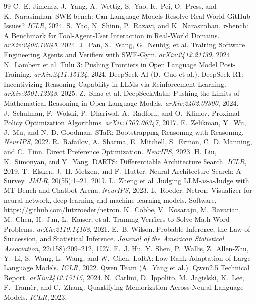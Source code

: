 \documentclass[11pt]{article}
\begin{document}
\begin{thebibliography}{99}
 C.~E. Jimenez, J.~Yang, A.~Wettig, S.~Yao, K.~Pei, O.~Press, and K.~Narasimhan. SWE-bench: Can Language Models Resolve Real-World GitHub Issues? \emph{ICLR}, 2024.
 S.~Yao, N.~Shinn, P.~Razavi, and K.~Narasimhan. $\tau$-bench: A Benchmark for Tool-Agent-User Interaction in Real-World Domains. \emph{arXiv:2406.12045}, 2024.
 J.~Pan, X.~Wang, G.~Neubig, et al. Training Software Engineering Agents and Verifiers with SWE-Gym. \emph{arXiv:2412.21139}, 2024.
 N.~Lambert et al. Tulu 3: Pushing Frontiers in Open Language Model Post-Training. \emph{arXiv:2411.15124}, 2024.
 DeepSeek-AI (D.~Guo et al.). DeepSeek-R1: Incentivizing Reasoning Capability in LLMs via Reinforcement Learning. \emph{arXiv:2501.12948}, 2025.
 Z.~Shao et al. DeepSeekMath: Pushing the Limits of Mathematical Reasoning in Open Language Models. \emph{arXiv:2402.03300}, 2024.
 J.~Schulman, F.~Wolski, P.~Dhariwal, A.~Radford, and O.~Klimov. Proximal Policy Optimization Algorithms. \emph{arXiv:1707.06347}, 2017.
 E.~Zelikman, Y.~Wu, J.~Mu, and N.~D. Goodman. STaR: Bootstrapping Reasoning with Reasoning. \emph{NeurIPS}, 2022.
 R.~Rafailov, A.~Sharma, E.~Mitchell, S.~Ermon, C.~D. Manning, and C.~Finn. Direct Preference Optimization. \emph{NeurIPS}, 2023.
 H.~Liu, K.~Simonyan, and Y.~Yang. DARTS: Differentiable Architecture Search. \emph{ICLR}, 2019.
 T.~Elsken, J.~H. Metzen, and F.~Hutter. Neural Architecture Search: A Survey. \emph{JMLR}, 20(55):1--21, 2019.
 L.~Zheng et al. Judging LLM-as-a-Judge with MT-Bench and Chatbot Arena. \emph{NeurIPS}, 2023.
 L.~Roeder. Netron: Visualizer for neural network, deep learning and machine learning models. Software, \url{https://github.com/lutzroeder/netron}.
 K.~Cobbe, V.~Kosaraju, M.~Bavarian, M.~Chen, H.~Jun, L.~Kaiser, et al. Training Verifiers to Solve Math Word Problems. \emph{arXiv:2110.14168}, 2021.
 E.~B. Wilson. Probable Inference, the Law of Succession, and Statistical Inference. \emph{Journal of the American Statistical Association}, 22(158):209--212, 1927.
 E.~J. Hu, Y.~Shen, P.~Wallis, Z.~Allen-Zhu, Y.~Li, S.~Wang, L.~Wang, and W.~Chen. LoRA: Low-Rank Adaptation of Large Language Models. \emph{ICLR}, 2022.
 Qwen Team (A.~Yang et al.). Qwen2.5 Technical Report. \emph{arXiv:2412.15115}, 2024.
 N.~Carlini, D.~Ippolito, M.~Jagielski, K.~Lee, F.~Tram\`er, and C.~Zhang. Quantifying Memorization Across Neural Language Models. \emph{ICLR}, 2023.

\end{thebibliography}
\end{document}

